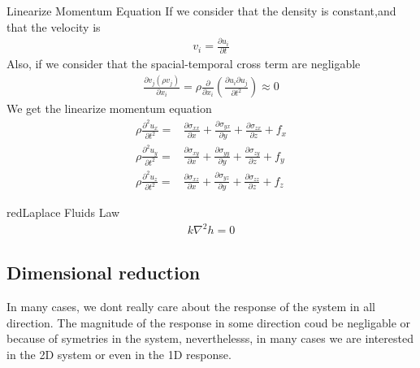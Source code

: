 \documentclass[a4paper, 11pt,article,oneside]{memoir}%
\begin{document}
\begin{eqbox2}{}{Linearize Momentum Equation}
If we consider that the density is constant,and that the velocity is 
\begin{gather*}
v_i=\frac{\partial u_i}{\partial t}
\end{gather*}
Also, if we consider that the spacial-temporal cross term are negligable
\begin{gather*}
\frac{\partial v_j( \rho v_j)}{\partial x_i}=\rho\frac{\partial}{\partial x_i}\left(\frac{\partial  u_i \partial  u_j}{\partial t^2}\right)\approx 0
\end{gather*}
We get the linearize momentum equation
\begin{align*}
\rho \frac{\partial^2u_x}{\partial t^2}=
&\frac{\partial\sigma_{xx}}{\partial x}+\frac{\partial\sigma_{yx}}{\partial y}+\frac{\partial\sigma_{zx}}{\partial z}+f_x\\
\rho \frac{\partial^2u_y}{\partial t^2}=&\frac{\partial\sigma_{xy}}{\partial x}+\frac{\partial\sigma_{yy}}{\partial y}+\frac{\partial\sigma_{zy}}{\partial z}+f_y\\
\rho \frac{\partial^2u_z}{\partial t^2}=&\frac{\partial\sigma_{xz}}{\partial x}+\frac{\partial\sigma_{yz}}{\partial y}+\frac{\partial\sigma_{zz}}{\partial z}+f_z
\end{align*}
\end{eqbox2}


\begin{eqbox2}{red}{Laplace Fluids Law}\label{LaplaceFlow}
\begin{align*}
k\nabla^2h=0
\end{align*}
\end{eqbox2}
{\color{magenta}\subsection{Dimensional reduction}}
In many cases, we dont really care about the response of the system in all direction. The magnitude of the response in some direction coud be negligable or because of symetries in the system, neverthelesss, in many cases we are interested in the 2D system or even in the 1D response. 
\end{document}
